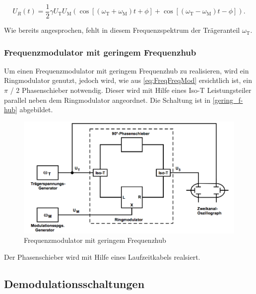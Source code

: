 \begin{equation}
U_R(t) = \frac{1}{2} \gamma U_\text{T} U_\text{M}  \left( \cos\left[(\omega_\text{T} + \omega_\text{M})t + \phi\right] + \cos\left[(\omega_\text{T} - \omega_\text{M})t - \phi \right] \right).
\end{equation}

Wie bereits angesprochen, fehlt in diesem Frequenzspektrum der Trägeranteil $\omega_\text{T}$.

\subsubsection{Frequenzmodulator mit geringem Frequenzhub}
Um einen Frequenzmodulator mit geringem Frequenzhub zu realisieren, wird ein Ringmodulator genutzt, jedoch wird, wie aus \autoref{eq:FreqFreqMod} ersichtlich ist, ein $\pi$ / $2$ Phasenschieber notwendig. Dieser wird mit Hilfe eines Iso-T Leistungsteiler parallel neben dem Ringmodulator angeordnet. Die Schaltung ist in \autoref{gering_f-hub} abgebildet.

\begin{figure}
	\centering
	\includegraphics[width=\textwidth]{img/Abb7.png}
	\caption{Frequenzmodulator mit geringem Frequenzhub \cite{FP}}
	\label{gering_f-hub}
\end{figure}

Der Phasenschieber wird mit Hilfe eines Laufzeitkabels realsiert.

\subsection{Demodulationsschaltungen}
